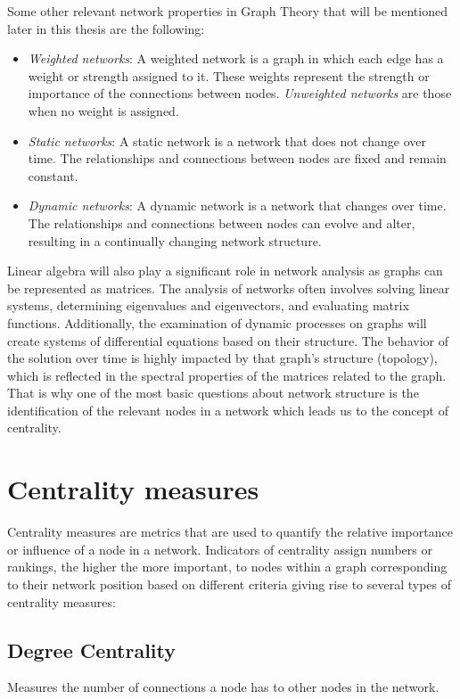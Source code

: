 Some other relevant network properties in Graph Theory that will be mentioned later in this thesis are the following:
\begin{itemize}
  \item \textit{Weighted networks}: A weighted network is a graph in which each edge has a weight or strength assigned to it. These weights represent the strength or importance of the connections between nodes. \textit{Unweighted networks} are those when no weight is assigned.
  \item \textit{Static networks}: A static network is a network that does not change over time. The relationships and connections between nodes are fixed and remain constant. 
  \item \textit{Dynamic networks}: A dynamic network is a network that changes over time. The relationships and connections between nodes can evolve and alter, resulting in a continually changing network structure.
\end{itemize}

Linear algebra will also play a significant role in network analysis as graphs can be represented as matrices. The analysis of networks often involves solving linear systems, determining eigenvalues and eigenvectors, and evaluating matrix functions. Additionally, the examination of dynamic processes on graphs will create systems of differential equations based on their structure. The behavior of the solution over time is highly impacted by that graph's structure (topology), which is reflected in the spectral properties of the matrices related to the graph. That is why one of the most basic questions about network structure is the identification of the relevant nodes in a network which leads us to the concept of centrality.

\section{Centrality measures}
\label{sec:centra}
 Centrality measures are metrics that are used to quantify the relative importance or influence of a node in a network. Indicators of centrality assign numbers or rankings, the higher the more important, to nodes within a graph corresponding to their network position based on different criteria giving rise to several types of centrality measures:

\subsection*{Degree Centrality} Measures the number of connections a node has to other nodes in the network.

